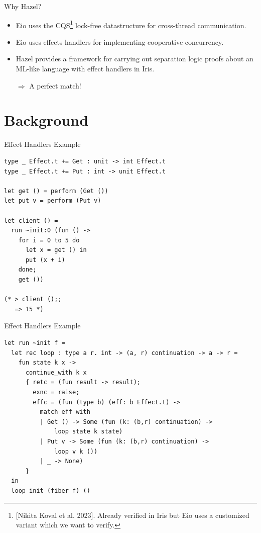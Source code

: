 \documentclass[aspectratio=43]{beamer}
\begin{document}
\begin{frame}{Why Hazel?}
    \begin{itemize}
        \item Eio uses the CQS\footnote{[Nikita Koval et al. 2023]. Already verified in Iris but Eio uses a customized variant which we want to verify.} lock-free datastructure for cross-thread communication.
        \item Eio uses effects handlers for implementing cooperative concurrency.
        \item Hazel provides a framework for carrying out separation logic proofs about an ML-like language with effect handlers in Iris.
        \item[\(\Rightarrow\)] A perfect match!
    \end{itemize}

\end{frame}

\section{Background}

\begin{frame}[fragile]{Effect Handlers Example}
    \begin{verbatim}
type _ Effect.t += Get : unit -> int Effect.t
type _ Effect.t += Put : int -> unit Effect.t

let get () = perform (Get ())
let put v = perform (Put v)

let client () = 
  run ~init:0 (fun () ->
    for i = 0 to 5 do
      let x = get () in
      put (x + i)
    done;
    get ())

(* > client ();;
   => 15 *)
\end{verbatim}
\end{frame}

\begin{frame}[fragile]{Effect Handlers Example}
    \begin{verbatim}
let run ~init f =
  let rec loop : type a r. int -> (a, r) continuation -> a -> r =
    fun state k x ->
      continue_with k x
      { retc = (fun result -> result);
        exnc = raise;
        effc = (fun (type b) (eff: b Effect.t) ->
          match eff with
          | Get () -> Some (fun (k: (b,r) continuation) ->
              loop state k state)
          | Put v -> Some (fun (k: (b,r) continuation) ->
              loop v k ())
          | _ -> None)
      }
  in
  loop init (fiber f) ()
\end{verbatim}
\end{frame}
\end{document}
